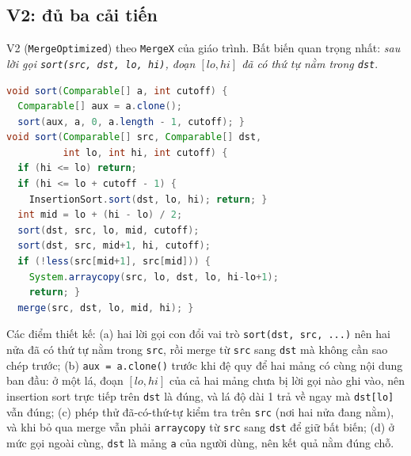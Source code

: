 \documentclass[11pt,a4paper]{article}
\begin{document}
\subsection{V2: đủ ba cải tiến}
V2 (\texttt{MergeOptimized}) theo \texttt{MergeX} của giáo trình. Bất biến quan trọng nhất:
\emph{sau lời gọi \texttt{sort(src, dst, lo, hi)}, đoạn $[lo, hi]$ đã có thứ tự nằm trong \texttt{dst}}.
\begin{lstlisting}[language=Java]
void sort(Comparable[] a, int cutoff) {
  Comparable[] aux = a.clone();
  sort(aux, a, 0, a.length - 1, cutoff); }
void sort(Comparable[] src, Comparable[] dst,
          int lo, int hi, int cutoff) {
  if (hi <= lo) return;
  if (hi <= lo + cutoff - 1) {
    InsertionSort.sort(dst, lo, hi); return; }
  int mid = lo + (hi - lo) / 2;
  sort(dst, src, lo, mid, cutoff);
  sort(dst, src, mid+1, hi, cutoff);
  if (!less(src[mid+1], src[mid])) {
    System.arraycopy(src, lo, dst, lo, hi-lo+1);
    return; }
  merge(src, dst, lo, mid, hi); }
\end{lstlisting}
Các điểm thiết kế:
(a) hai lời gọi con đổi vai trò \texttt{sort(dst, src, ...)} nên hai nửa đã có thứ tự nằm trong \texttt{src},
rồi merge từ \texttt{src} sang \texttt{dst} mà không cần sao chép trước;
(b) \texttt{aux = a.clone()} trước khi đệ quy để hai mảng có cùng nội dung ban đầu: ở một lá, đoạn
$[lo, hi]$ của cả hai mảng chưa bị lời gọi nào ghi vào, nên insertion sort trực tiếp trên \texttt{dst} là đúng,
và lá độ dài 1 trả về ngay mà \texttt{dst[lo]} vẫn đúng;
(c) phép thử đã-có-thứ-tự kiểm tra trên \texttt{src} (nơi hai nửa đang nằm), và khi bỏ qua merge vẫn phải
\texttt{arraycopy} từ \texttt{src} sang \texttt{dst} để giữ bất biến;
(d) ở mức gọi ngoài cùng, \texttt{dst} là mảng \texttt{a} của người dùng, nên kết quả nằm đúng chỗ.
\end{document}
